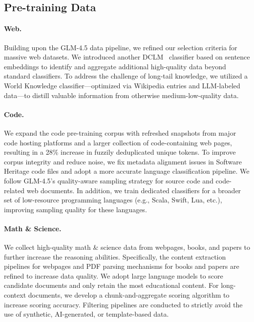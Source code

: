 \subsection{Pre-training Data}

\paragraph{Web.} Building upon the GLM-4.5 data pipeline, we refined our selection criteria for massive web datasets. We introduced another DCLM~\cite{li2025datacomplmsearchgenerationtraining} classifier based on sentence embeddings to identify and aggregate additional high-quality data beyond standard classifiers. To address the challenge of long-tail knowledge, we utilized a World Knowledge classifier—optimized via Wikipedia entries and LLM-labeled data—to distill valuable information from otherwise medium-low-quality data.

\paragraph{Code.} We expand the code pre-training corpus with refreshed snapshots from major code hosting platforms and a larger collection of code-containing web pages, resulting in a 28\% increase in fuzzily deduplicated unique tokens. To improve corpus integrity and reduce noise, we fix metadata alignment issues in Software Heritage code files and adopt a more accurate language classification pipeline. We follow GLM-4.5’s quality-aware sampling strategy for source code and code-related web documents. In addition, we train dedicated classifiers for a broader set of low-resource programming languages (e.g., Scala, Swift, Lua, etc.), improving sampling quality for these languages.

\paragraph{Math \& Science.} We collect high-quality math \& science data from webpages, books, and papers to further increase the reasoning abilities. Specifically, the content extraction pipelines for webpages and PDF parsing mechanisms
for books and papers are refined to increase data quality. We adopt large language models to score candidate documents and only retain the most educational content. For long-context documents, we develop a chunk-and-aggregate scoring algorithm to increase scoring accuracy. Filtering pipelines are conducted to strictly avoid the use of synthetic, AI-generated, or template-based data. 



